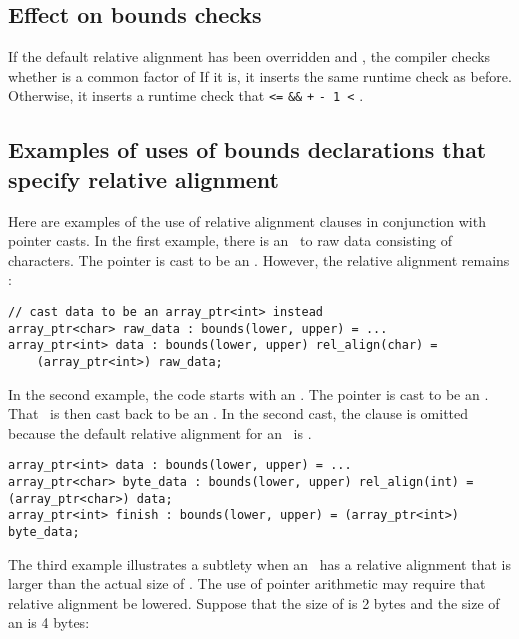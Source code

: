 \subsection{Effect on bounds checks}

If the default relative alignment has been overridden and
, the compiler checks whether
 is a common factor of 
If it is, it inserts the same
runtime check as before. Otherwise, it inserts a runtime check that
 \lstinline|<=|  \lstinline|&&|
 \lstinline|+|  \lstinline|- 1 <| .

\subsection{Examples of uses of bounds declarations that specify relative alignment}

Here are examples of the use of relative alignment clauses in
conjunction with pointer casts. In the first example, there is an
\arrayptr\ to raw data consisting of characters. The pointer is
cast to be an \arrayptrint . However,
the relative alignment remains :

\begin{lstlisting}
// cast data to be an array_ptr<int> instead
array_ptr<char> raw_data : bounds(lower, upper) = ...
array_ptr<int> data : bounds(lower, upper) rel_align(char) =
    (array_ptr<int>) raw_data;
\end{lstlisting}

In the second example, the code starts with an
\arrayptrint. The pointer is cast to
be an \arrayptrchar. That
\arrayptr\ is then cast back to be an
\arrayptrint . In the second cast, the
 clause is omitted because the default relative
alignment for an \arrayptrint\ is
.

\begin{lstlisting}
array_ptr<int> data : bounds(lower, upper) = ...
array_ptr<char> byte_data : bounds(lower, upper) rel_align(int) = (array_ptr<char>) data;
array_ptr<int> finish : bounds(lower, upper) = (array_ptr<int>) byte_data;
\end{lstlisting}

The third example illustrates a subtlety when an
\arrayptrT\ has a
relative alignment that is larger than the actual size of . The
use of pointer arithmetic may require that relative alignment be
lowered. Suppose that the size of  is 2 bytes and the
size of an  is 4 bytes:

